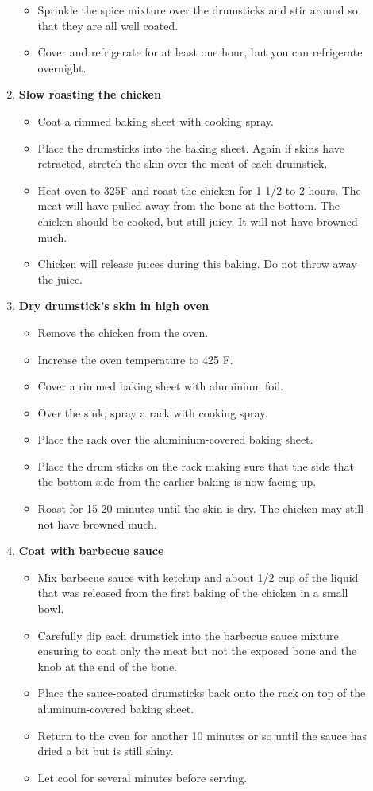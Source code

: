 \documentclass[11pt,letterpaper]{article}
\begin{document}
\begin{description}
\begin{enumerate}
\begin{itemize}
		\item Sprinkle the spice mixture over the drumsticks and stir around so that they are all well coated.
		\item Cover and refrigerate for at least one hour, but you can refrigerate overnight.
		\end{itemize}
	\item {\bf Slow roasting the chicken}
		\begin{itemize}
		\item Coat a rimmed baking sheet with cooking spray.
		\item Place the drumsticks into the baking sheet. Again if skins have retracted, stretch the skin over the meat of each drumstick.
		\item Heat oven to 325F and roast the chicken for 1 1/2 to 2 hours. The meat will have pulled away from the bone at the bottom. The chicken should be cooked, but still juicy. It will not have browned much.
		\item Chicken will release juices during this baking. Do not throw away the juice.
		\end{itemize}
	\item {\bf Dry drumstick's skin in high oven}
		\begin{itemize}
		 \item Remove the chicken from the oven.
		 \item Increase the oven temperature to 425 F.
		 \item Cover a rimmed baking sheet with aluminium foil.
		 \item Over the sink, spray a rack with cooking spray.
		 \item Place the rack over the aluminium-covered baking sheet.
		 \item Place the drum sticks on the rack making sure that the side that the bottom side from the earlier baking is now facing up.
		 \item Roast for 15-20 minutes until the skin is dry. The chicken may still not have browned much.
		 \end{itemize}
	\item {\bf Coat with barbecue sauce}
		\begin{itemize}
		\item Mix barbecue sauce with ketchup and about 1/2 cup of the liquid that was released from the first baking of the chicken in a small bowl.
		\item Carefully dip each drumstick into the barbecue sauce mixture ensuring to coat only the meat but not the exposed bone and the knob at the end of the bone.
		\item Place the sauce-coated drumsticks back onto the rack on top of the aluminum-covered baking sheet.
		\item Return to the oven for another 10 minutes or so until the sauce has dried a bit but is still shiny.
		\item Let cool for several minutes before serving. 
		\end{itemize}
     	\end{enumerate}         
\end{description}
\end{document}
